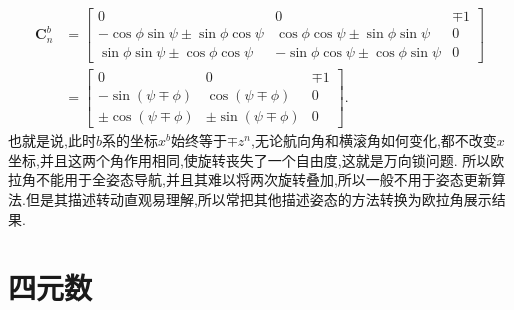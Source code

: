 \documentclass[10pt,a4paper]{ctexbook}
\theoremstyle{definition}
\begin{document}
\begin{align*}
    \mathbf{C}_n^b&=\begin{bmatrix}
        0 & 0 & \mp 1 \\
        -\cos\phi\sin\psi \pm \sin\phi\cos\psi & \cos\phi\cos\psi\pm\sin\phi\sin\psi & 0 \\
        \sin\phi\sin\psi \pm \cos\phi\cos\psi & -\sin\phi\cos\psi\pm\cos\phi\sin\psi & 0
    \end{bmatrix}\\
    &=\begin{bmatrix}
        0 & 0 & \mp 1 \\
        -\sin(\psi \mp \phi) & \cos(\psi \mp \phi) & 0 \\
        \pm\cos(\psi \mp \phi) & \pm\sin(\psi \mp \phi) & 0
    \end{bmatrix}.
\end{align*}
也就是说,此时$b$系的坐标$x^b$始终等于$\mp z^n$,无论航向角和横滚角如何变化,都不改变$x$坐标,并且这两个角作用相同,使旋转丧失了一个自由度,这就是万向锁问题.%
所以欧拉角不能用于全姿态导航,并且其难以将两次旋转叠加,所以一般不用于姿态更新算法.但是其描述转动直观易理解,所以常把其他描述姿态的方法转换为欧拉角展示结果.

\section{四元数}
\end{document}
